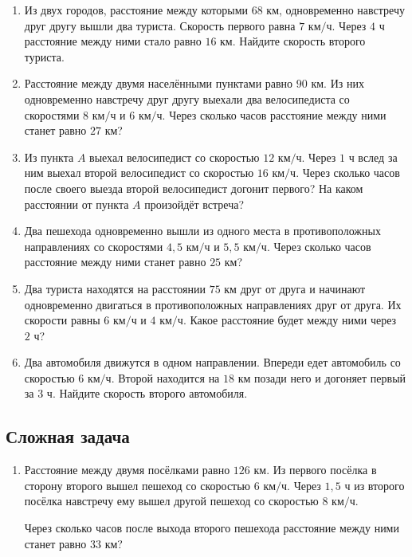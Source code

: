 \documentclass[a4paper,12pt]{article}
\newcommand{\km}{\text{ км}}
\newcommand{\kmh}{\text{ км/ч}}
\newcommand{\hour}{\text{ ч}}
\begin{document}
\begin{enumerate}[label=\textbf{\arabic*.},start=4]

\item
Из двух городов, расстояние между которыми \(68\km\), одновременно
навстречу друг другу вышли два туриста.
Скорость первого равна \(7\kmh\).
Через \(4\hour\) расстояние между ними стало равно \(16\km\).
Найдите скорость второго туриста.

\item
Расстояние между двумя населёнными пунктами равно \(90\km\).
Из них одновременно навстречу друг другу выехали два велосипедиста со
скоростями \(8\kmh\) и \(6\kmh\).
Через сколько часов расстояние между ними станет равно \(27\km\)?

\item
Из пункта \(A\) выехал велосипедист со скоростью \(12\kmh\).
Через \(1\hour\) вслед за ним выехал второй велосипедист со скоростью
\(16\kmh\).
Через сколько часов после своего выезда второй велосипедист догонит
первого?
На каком расстоянии от пункта \(A\) произойдёт встреча?

\item
Два пешехода одновременно вышли из одного места в противоположных
направлениях со скоростями \(4{,}5\kmh\) и \(5{,}5\kmh\).
Через сколько часов расстояние между ними станет равно \(25\km\)?

\item
Два туриста находятся на расстоянии \(75\km\) друг от друга и начинают
одновременно двигаться в противоположных направлениях друг от друга.
Их скорости равны \(6\kmh\) и \(4\kmh\).
Какое расстояние будет между ними через \(2\hour\)?

\item
Два автомобиля движутся в одном направлении.
Впереди едет автомобиль со скоростью \(6\kmh\).
Второй находится на \(18\km\) позади него и догоняет первый за
\(3\hour\).
Найдите скорость второго автомобиля.

\end{enumerate}

\subsection*{\textcolor{accent}{Сложная задача}}

\begin{enumerate}[label=\textbf{\arabic*.},start=10]

\item
Расстояние между двумя посёлками равно \(126\km\).
Из первого посёлка в сторону второго вышел пешеход со скоростью
\(6\kmh\).
Через \(1{,}5\hour\) из второго посёлка навстречу ему вышел другой
пешеход со скоростью \(8\kmh\).

Через сколько часов после выхода второго пешехода расстояние между ними
станет равно \(33\km\)?

\end{enumerate}
\end{document}
